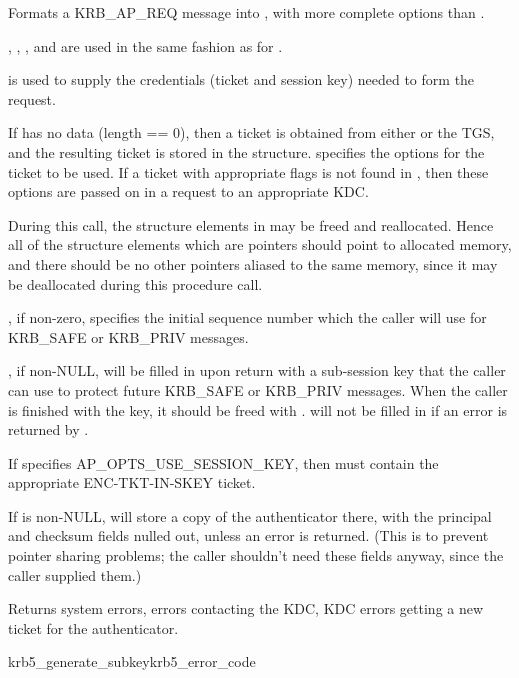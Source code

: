 Formats a KRB_AP_REQ message into , with more complete
options than .

, , ,
and  are used in the same fashion as for
.

 is used to supply the credentials (ticket and session
key) needed to form the request.

If  has no data (length == 0), then a
ticket is obtained from either  or the TGS, and the
resulting ticket is stored in the  structure.  
 specifies the options 
for the ticket to be used. If a ticket with appropriate flags is not
found in
, then these options are passed on in a request to an
appropriate KDC.

During this call, the structure elements in  may be
freed and reallocated.  Hence all of the structure elements which are
pointers should point to allocated memory, and there should be no other
pointers aliased to the same memory, since it may be deallocated during
this procedure call.

, if non-zero, specifies the initial sequence number
which the caller will use for KRB_SAFE or KRB_PRIV messages.

, if non-NULL, will be filled in upon return with a 
sub-session key that the caller can use to protect future KRB_SAFE or
KRB_PRIV messages.  When the caller is finished with the key, it should
be freed with .   will
not be filled in if an error is returned by
.

If  specifies AP_OPTS_USE_SESSION_KEY, then
 must contain the appropriate
ENC-TKT-IN-SKEY ticket.

If  is non-NULL, 
will store
a copy of the authenticator there, with the principal and checksum fields
nulled out, unless an error is returned.  (This is to prevent pointer
sharing problems; the caller
shouldn't need these fields anyway, since the caller supplied them.)

Returns system errors, errors contacting the KDC, KDC errors getting
a new ticket for the authenticator.

\begin{funcdecl}{krb5_generate_subkey}{krb5_error_code}{\funcin}
\funcout
{}
\end{funcdecl}

